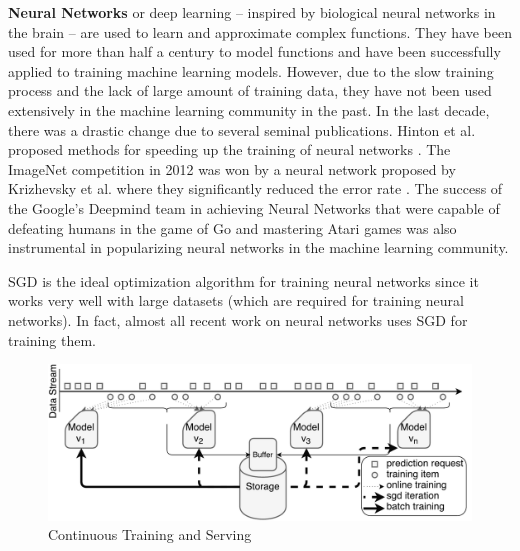 \documentclass{vldb}
\begin{document}
\textbf{Neural Networks} or deep learning -- inspired by biological neural networks in the brain -- are used to learn and approximate complex functions. 
They have been used for more than half a century to model functions and have been successfully applied to training machine learning models.
However, due to the slow training process and the lack of large amount of training data, they have not been used extensively in the machine learning community in the past.
In the last decade, there was a drastic change due to several seminal publications.
Hinton et al. proposed methods for speeding up the training of neural networks \cite{hinton2006fast}.
The ImageNet competition \cite{ILSVRC15} in 2012 was won by a neural network proposed by Krizhevsky et al. where they significantly reduced the error rate \cite{krizhevsky2012imagenet}. 
The success of the Google's Deepmind team in achieving Neural Networks that were capable of defeating humans in the game of Go \cite{silver2016mastering} and mastering Atari games \cite{mnih2013playing} was also instrumental in popularizing neural networks in the machine learning community.

SGD is the ideal optimization algorithm for training neural networks since it works very well with large datasets (which are required for training neural networks).
In fact, almost all recent work on neural networks uses SGD for training them.

\begin{figure}[t]
\centering
\includegraphics[width=\columnwidth]{../images/continuous-final.pdf}
\caption{Continuous Training and Serving}
\label{fig:cont-training-serving}
\end{figure}
\end{document}
